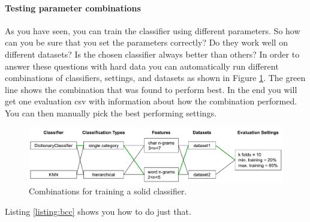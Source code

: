 \paragraph{Testing parameter combinations}
As you have seen, you can train the classifier using different parameters. So how can you be sure that you set the parameters correctly? Do they work well on different datasets? Is the chosen classifier always better than others? In order to answer these questions with hard data you can automatically run different combinations of classifiers, settings, and datasets as shown in Figure \ref{fig:bcc}. The green line shows the combination that was found to perform best. In the end you will get one evaluation csv with information about how the combination performed. You can then manually pick the best performing settings.

\begin{figure}[ht!]
\centering
\includegraphics[width=\columnwidth]{img/bcc.pdf}
\caption{Combinations for training a solid classifier.}
\label{fig:bcc}
\end{figure}

Listing \ref{listing:bcc} shows you how to do just that.

